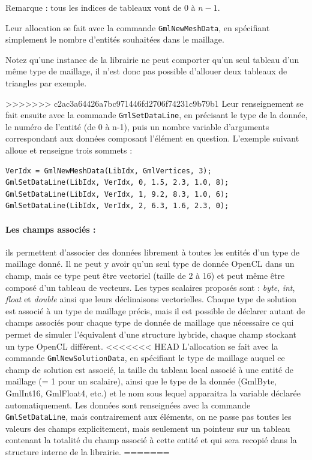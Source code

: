 \documentclass[a4paper,12pt]{article}
\begin{document}
Remarque : tous les indices de tableaux vont de $0$ à $n-1$.

Leur allocation se fait avec la commande {\tt GmlNewMeshData}, en spécifiant simplement le nombre d'entités souhaitées dans le maillage.

Notez qu'une instance de la librairie ne peut comporter qu'un seul tableau d'un même type de maillage, il n'est donc pas possible d'allouer deux tableaux de triangles par exemple.

>>>>>>> c2ac3a64426a7bc971446fd2706f74231c9b79b1
Leur renseignement se fait ensuite avec la commande {\tt GmlSetDataLine}, en précisant le type de la donnée, le numéro de l'entité (de 0 à n-1), puis un nombre variable d'arguments correspondant aux données composant l'élément en question.
L'exemple suivant alloue et renseigne trois sommets :

\begin{tt}
\begin{verbatim}
VerIdx = GmlNewMeshData(LibIdx, GmlVertices, 3);
GmlSetDataLine(LibIdx, VerIdx, 0, 1.5, 2.3, 1.0, 8);
GmlSetDataLine(LibIdx, VerIdx, 1, 9.2, 8.3, 1.0, 6);
GmlSetDataLine(LibIdx, VerIdx, 2, 6.3, 1.6, 2.3, 0);
\end{verbatim}
\end{tt}
\normalfont

\paragraph{Les champs associés : } ils permettent d'associer des données librement à toutes les entités d'un type de maillage donné.
Il ne peut y avoir qu'un seul type de donnée OpenCL dans un champ, mais ce type peut être vectoriel (taille de 2 à 16) et peut même être composé d'un tableau de vecteurs.
Les types scalaires proposés sont : \emph{byte}, \emph{int}, \emph{float} et \emph{double} ainsi que leurs déclinaisons vectorielles.
Chaque type de solution est associé à un type de maillage précis, mais il est possible de déclarer autant de champs associés pour chaque type de donnée de maillage que nécessaire ce qui permet de simuler l’équivalent d'une structure hybride, chaque champ stockant un type OpenCL différent.
<<<<<<< HEAD
L'allocation se fait avec la commande {\tt GmlNewSolutionData}, en spécifiant le type de maillage auquel ce champ de solution est associé, la taille du tableau local associé à une entité de maillage (= 1 pour un scalaire), ainsi que le type de la donnée (GmlByte, GmlInt16, GmlFloat4, etc.) et le nom sous lequel apparaitra la variable déclarée automatiquement.
Les données sont renseignées avec la commande {\tt GmlSetDataLine}, mais contrairement aux éléments, on ne passe pas toutes les valeurs des champs explicitement, mais seulement un pointeur sur un tableau contenant la totalité du champ associé à cette entité et qui sera recopié dans la structure interne de la librairie.
=======
\end{document}
